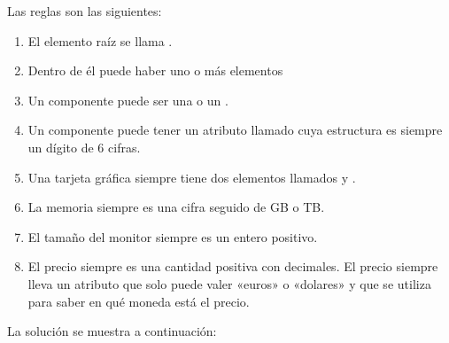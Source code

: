\documentclass[letterpaper,10pt,spanish]{sphinxmanual}
\begin{document}
Las reglas son las siguientes:
\begin{enumerate}
\item {} 
El elemento raíz se llama .

\item {} 
Dentro de él puede haber uno o más elementos 

\item {} 
Un componente puede ser una  o un .

\item {} 
Un componente puede tener un atributo llamado  cuya estructura es siempre un dígito de 6 cifras.

\item {} 
Una tarjeta gráfica siempre tiene dos elementos llamados  y .

\item {} 
La memoria siempre es una cifra seguido de GB o TB.

\item {} 
El tamaño del monitor siempre es un entero positivo.

\item {} 
El precio siempre es una cantidad positiva con decimales. El precio siempre lleva un atributo  que solo puede valer «euros» o «dolares» y que se utiliza para saber en qué moneda está el precio.

\end{enumerate}

La solución se muestra a continuación:
\end{document}
